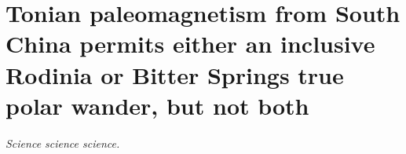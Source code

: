 \chapter[Tonian paleomagnetism from South China permits either an inclusive Rodinia or Bitter Springs true polar wander, but not both][Xiajiang Group]{Tonian paleomagnetism from South China permits either an inclusive Rodinia or Bitter Springs true polar wander, but not both}

\textit{Science science science.}
